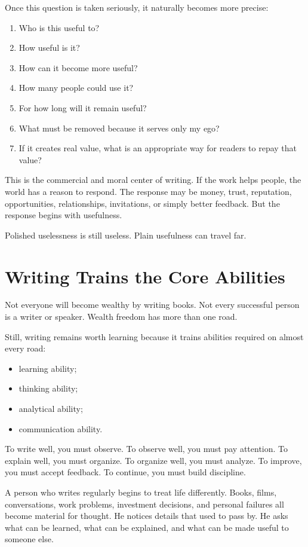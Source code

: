 Once this question is taken seriously, it naturally becomes more precise:

\begin{enumerate}
\item Who is this useful to?
\item How useful is it?
\item How can it become more useful?
\item How many people could use it?
\item For how long will it remain useful?
\item What must be removed because it serves only my ego?
\item If it creates real value, what is an appropriate way for readers to repay that value?
\end{enumerate}

This is the commercial and moral center of writing. If the work helps people, the world has a reason to respond. The response may be money, trust, reputation, opportunities, relationships, invitations, or simply better feedback. But the response begins with usefulness.

Polished uselessness is still useless. Plain usefulness can travel far.

\section*{Writing Trains the Core Abilities}

Not everyone will become wealthy by writing books. Not every successful person is a writer or speaker. Wealth freedom has more than one road.

Still, writing remains worth learning because it trains abilities required on almost every road:

\begin{itemize}
\item learning ability;
\item thinking ability;
\item analytical ability;
\item communication ability.
\end{itemize}

To write well, you must observe. To observe well, you must pay attention. To explain well, you must organize. To organize well, you must analyze. To improve, you must accept feedback. To continue, you must build discipline.

A person who writes regularly begins to treat life differently. Books, films, conversations, work problems, investment decisions, and personal failures all become material for thought. He notices details that used to pass by. He asks what can be learned, what can be explained, and what can be made useful to someone else.


